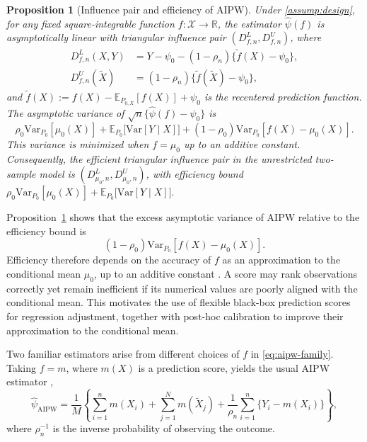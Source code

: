 \documentclass{article}
\theoremstyle{plain}
\newtheorem{proposition}{Proposition}
\theoremstyle{definition}
\newcommand{\E}{\mathbb{E}}
\newcommand{\Var}{\mathrm{Var}}
\newcommand{\R}{\mathbb{R}}
\newcommand{\1}{\mathbbm{1}}
\newcommand{\rhozero}{\rho_0}
\newcommand{\Px}{P_{0,X}}
\begin{document}
\begin{proposition}[Influence pair and efficiency of AIPW]
\label{prop:aipw-class}
Under \cref{assump:design}, for any fixed square-integrable
function $f:\mathcal X\to\R$, the estimator $\widehat\psi(f)$
is asymptotically linear with triangular influence pair
$(D_{f,n}^L,D_{f,n}^U)$, where
\begin{align*}
D_{f,n}^L(X,Y)
&=
Y-\psi_0-(1-\rho_n)\{\tilde f(X)-\psi_0\},\\
D_{f,n}^U(\widetilde X)
&=
(1-\rho_n)\{\tilde f(\widetilde X)-\psi_0\},
\end{align*}
and $\tilde f(X):=f(X)-\E_{\Px}[f(X)]+\psi_0$
is the recentered prediction function. The asymptotic variance
of $\sqrt n\{\widehat\psi(f)-\psi_0\}$ is
\[
\rhozero\Var_{P_0}[\mu_0(X)]
+
\E_{P_0}\!\bigl[\Var[Y\mid X]\bigr]
+
(1-\rhozero)\Var_{P_0}[f(X)-\mu_0(X)].
\]
This variance is minimized when $f=\mu_0$ up to an additive
constant. Consequently, the efficient triangular influence
pair in the unrestricted two-sample model is
$(D_{\mu_0,n}^L,D_{\mu_0,n}^U)$, with efficiency bound $\rhozero\Var_{P_0}[\mu_0(X)]
+
\E_{P_0}\!\bigl[\Var[Y\mid X]\bigr].$
\end{proposition}

Proposition~\ref{prop:aipw-class} shows that the excess
asymptotic variance of AIPW relative to the efficiency bound is
\[
(1-\rhozero)\Var_{P_0}[f(X)-\mu_0(X)].
\]
Efficiency therefore depends on the accuracy of $f$ as an
approximation to the conditional mean $\mu_0$, up to an additive
constant \citep{wang2025efficient}. A score may rank observations
correctly yet remain inefficient if its numerical values are
poorly aligned with the conditional mean. This motivates the use of flexible black-box prediction scores
for regression adjustment, together with post-hoc calibration
to improve their approximation to the conditional mean.

Two familiar estimators arise from different choices of $f$ in
\eqref{eq:aipw-family}. Taking $f=m$, where $m(X)$ is a prediction
score, yields the usual AIPW estimator \citep{robins1994estimation},
\[
\widehat{\psi}_{\mathrm{AIPW}}
=
\frac{1}{M}\left\{
\sum_{i=1}^n m(X_i)
+
\sum_{j=1}^N m(\widetilde X_j)
+
\frac{1}{\rho_n}\sum_{i=1}^n \{Y_i-m(X_i)\}
\right\},
\]
where $\rho_n^{-1}$ is the inverse probability of observing the
outcome.
\end{document}
